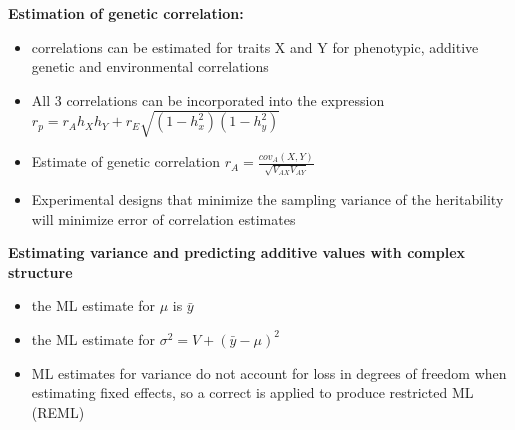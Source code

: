 \documentclass[12pt]{amsart}
\begin{document}
{\large \bf Estimation of genetic correlation:}
\begin{itemize}
\item correlations can be estimated for traits X and Y for phenotypic, additive genetic and environmental correlations
\item All 3 correlations can be incorporated into the expression $r_p = r_Ah_Xh_Y + r_E\sqrt{(1-h^2_x)(1-h^2_y)}$
\item Estimate of genetic correlation $r_A = \frac{cov_A(X,Y)}{\sqrt{V_{AX}V_{AY}}}$
\item Experimental designs that minimize the sampling variance of the heritability will minimize error of correlation estimates 
\end{itemize}
{\large \bf Estimating variance and predicting additive values with complex structure}
\begin{itemize}
\item the ML estimate for $\mu$ is $\bar{y}$
\item the ML estimate for $\sigma^2 = V + (\bar{y} - \mu)^2$
\item ML estimates for variance do not account for loss in degrees of freedom when estimating fixed effects, so a correct is applied to produce restricted ML (REML)

\end{itemize}
\end{document}
